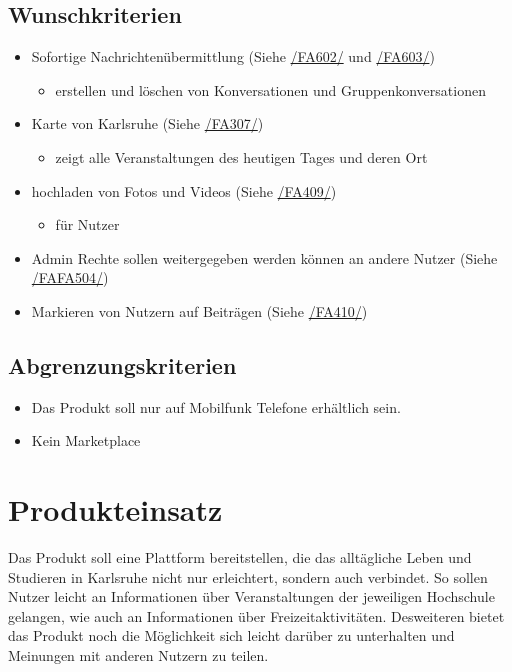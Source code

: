 \documentclass[parskip=full]{scrartcl}
\begin{document}
	\subsection{Wunschkriterien}
		\begin{itemize}[nosep] 
			\item Sofortige Nachrichtenübermittlung (Siehe \hyperref[sec:FA602]{/FA602/} und \hyperref[sec:FA603]{/FA603/})
			\begin{itemize}
				\item erstellen und löschen von Konversationen und Gruppenkonversationen
			\end{itemize}
			
			\item Karte von Karlsruhe (Siehe \hyperref[sec:FA307]{/FA307/})
				\begin{itemize}
					\item zeigt alle Veranstaltungen des heutigen Tages und deren Ort
				\end{itemize}
			\item hochladen von Fotos und Videos (Siehe \hyperref[sec:FA409]{/FA409/})
				\begin{itemize}
					\item für Nutzer
				\end{itemize}
			\item Admin Rechte sollen weitergegeben werden können an andere Nutzer 
			(Siehe \hyperref[sec:FA504]{/FAFA504/})
			\item Markieren von Nutzern auf Beiträgen (Siehe \hyperref[sec:FA410]{/FA410/})
		\end{itemize}
		
	\subsection{Abgrenzungskriterien}
	\begin{itemize}
		\item Das Produkt soll nur auf Mobilfunk Telefone erhältlich sein.
		\item Kein Marketplace
	\end{itemize}
	\newpage
	
	
	\section{Produkteinsatz}
	Das Produkt soll eine Plattform bereitstellen, die das alltägliche Leben und Studieren in Karlsruhe nicht nur erleichtert, sondern auch verbindet. So sollen Nutzer leicht an Informationen über Veranstaltungen der jeweiligen Hochschule gelangen, wie auch an Informationen über Freizeitaktivitäten. Desweiteren bietet das Produkt noch die Möglichkeit sich leicht darüber zu unterhalten und Meinungen mit anderen Nutzern zu teilen.
	
\end{document}
